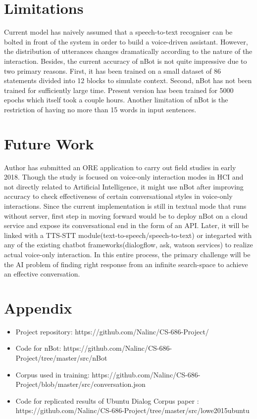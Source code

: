 \documentclass[letterpaper] {article} %
\begin{document}
\section{Limitations}
Current model has naively assumed that a speech-to-text recogniser can be bolted in front of the system in order to build a voice-driven assistant. However, the distribution of utterances changes dramatically according to the nature of the interaction. Besides, the current accuracy of nBot is not quite impressive due to two primary reasons. First, it has been trained on a small dataset of 86 statements divided into 12 blocks to simulate context. Second, nBot has not been trained for sufficiently large time. Present version has been trained for 5000 epochs which itself took a couple hours. Another limitation of nBot is the restriction of having no more than 15 words in input sentences.

\section{Future Work}
Author has submitted an ORE application to carry out field studies in early 2018. Though the study is focused on voice-only interaction modes in HCI and not directly related to Artificial Intelligence, it might use nBot after improving accuracy to check effectiveness of certain conversational styles in voice-only interactions. Since the current implementation is still in textual mode that runs without server, first step in moving forward would be to deploy nBot on a cloud service and expose its conversational end in the form of an API. Later, it will be linked with a TTS-STT module(text-to-speech/speech-to-text) or integarted with any of the existing chatbot frameworks(dialogflow, ask, watson services) to realize actual voice-only interaction. In this entire process, the primary challenge will be the AI problem of finding right response from an infinite search-space to achieve an effective conversation.



\newpage
\section{Appendix}
\begin{itemize}
	\item Project repository: https://github.com/Nalinc/CS-686-Project/
	\item Code for nBot: https://github.com/Nalinc/CS-686-Project/tree/master/src/nBot
	\item Corpus used in training: https://github.com/Nalinc/CS-686-Project/blob/master/src/conversation.json
	\item Code for replicated results of Ubuntu Dialog Corpus paper \cite{lowe2015ubuntu} : https://github.com/Nalinc/CS-686-Project/tree/master/src/lowe2015ubuntu
\end{itemize}
\end{document}
